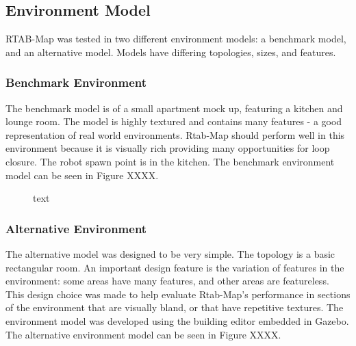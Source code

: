 \documentclass[a4paper]{article}
\begin{document}
\clearpage

\subsection{Environment Model}
RTAB-Map was tested in two different environment models: a benchmark model, and an alternative model. Models have differing topologies, sizes, and features. 

\subsubsection{Benchmark Environment}
The benchmark model is of a small apartment mock up, featuring a kitchen and lounge room. The model is highly textured and contains many features - a good representation of real world environments. Rtab-Map should perform well in this environment because it is visually rich providing many opportunities for loop closure. The robot spawn point is in the kitchen. The benchmark environment model can be seen in Figure XXXX.

\begin{figure}[h]
\centering
{}
\caption{text}
\end{figure}

\subsubsection{Alternative Environment}
The alternative model was designed to be very simple. The topology is a basic rectangular room. An important design feature is the variation of features in the environment: some areas have many features, and other areas are featureless. This design choice was made to help evaluate Rtab-Map's performance in sections of the environment that are visually bland, or that have repetitive textures. The environment model was developed using the building editor embedded in Gazebo. The alternative environment model can be seen in Figure XXXX.
\end{document}
